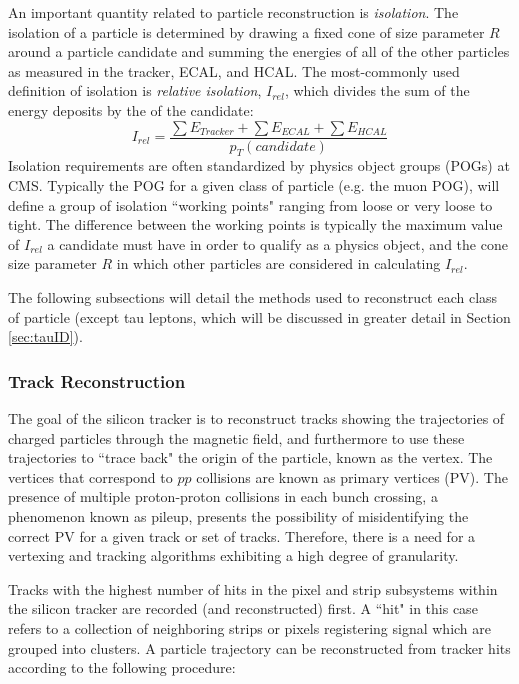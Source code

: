 An important quantity related to particle reconstruction is \textit{isolation}. The isolation of a particle is determined by drawing a fixed cone of size parameter $R$ around a particle candidate and summing the energies of all of the other particles as measured in the tracker, ECAL, and HCAL. The most-commonly used definition of isolation is \textit{relative isolation}, $I_{rel}$, which divides the sum of the energy deposits by the \pt of the candidate:
\begin{equation} \label{eq:iso}
I_{rel} = \frac{\sum E_{Tracker} + \sum E_{ECAL} + \sum E_{HCAL}}{p_T(candidate)}
\end{equation}
\noindent Isolation requirements are often standardized by physics object groups (POGs) at CMS. Typically the POG for a given class of particle (e.g. the muon POG), will define a group of isolation ``working points" ranging from loose or very loose to tight. The difference between the working points is typically the maximum value of $I_{rel}$ a candidate must have in order to qualify as a physics object, and the cone size parameter $R$ in which other particles are considered in calculating $I_{rel}$.

The following subsections will detail the methods used to reconstruct each class of particle (except tau leptons, which will be discussed in greater detail in Section \ref{sec:tauID}).

\subsubsection{Track Reconstruction}\label{sec:TrackReco}

The goal of the silicon tracker is to reconstruct tracks showing the trajectories of charged particles through the magnetic field, and furthermore to use these trajectories to ``trace back" the origin of the particle, known as the vertex. The vertices that correspond to $pp$ collisions are known as primary vertices (PV). The presence of multiple proton-proton collisions in each bunch crossing, a phenomenon known as pileup, presents the possibility of misidentifying the correct PV for a given track or set of tracks. Therefore, there is a need for a vertexing and tracking algorithms exhibiting a high degree of granularity.

Tracks with the highest number of hits in the pixel and strip subsystems within the silicon tracker are recorded (and reconstructed) first. A ``hit" in this case refers to a collection of neighboring strips or pixels registering signal which are grouped into clusters. A particle trajectory can be reconstructed from tracker hits according to the following procedure\cite{TrackReco}:


